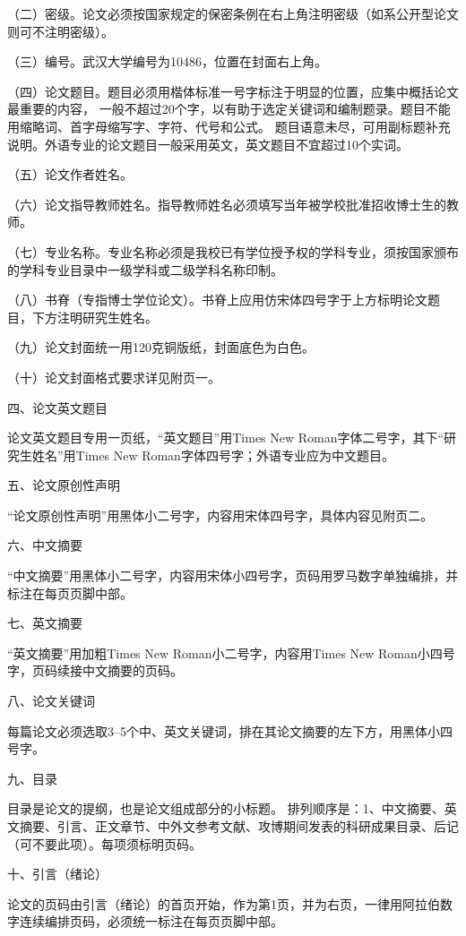 （二）密级。论文必须按国家规定的保密条例在右上角注明密级（如系公开型论文则可不注明密级）。

（三）编号。武汉大学编号为10486，位置在封面右上角。

（四）论文题目。题目必须用楷体标准一号字标注于明显的位置，应集中概括论文最重要的内容，
一般不超过20个字，以有助于选定关键词和编制题录。题目不能用缩略词、首字母缩写字、字符、代号和公式。
题目语意未尽，可用副标题补充说明。外语专业的论文题目一般采用英文，英文题目不宜超过10个实词。

（五）论文作者姓名。

（六）论文指导教师姓名。指导教师姓名必须填写当年被学校批准招收博士生的教师。

（七）专业名称。专业名称必须是我校已有学位授予权的学科专业，须按国家颁布的学科专业目录中一级学科或二级学科名称印制。

（八）书脊（专指博士学位论文）。书脊上应用仿宋体四号字于上方标明论文题目，下方注明研究生姓名。

（九）论文封面统一用120克铜版纸，封面底色为白色。

（十）论文封面格式要求详见附页一。

{\heiti 四、论文英文题目}

论文英文题目专用一页纸，“英文题目”用Times New Roman字体二号字，其下“研究生姓名”用Times New Roman字体四号字；外语专业应为中文题目。

{\heiti 五、论文原创性声明}

“论文原创性声明”用黑体小二号字，内容用宋体四号字，具体内容见附页二。

{\heiti 六、中文摘要}

“中文摘要”用黑体小二号字，内容用宋体小四号字，页码用罗马数字单独编排，并标注在每页页脚中部。

{\heiti 七、英文摘要}

“英文摘要”用加粗Times New Roman小二号字，内容用Times New Roman小四号字，页码续接中文摘要的页码。

{\heiti 八、论文关键词}

每篇论文必须选取3--5个中、英文关键词，排在其论文摘要的左下方，用黑体小四号字。

{\heiti 九、目录}

目录是论文的提纲，也是论文组成部分的小标题。
排列顺序是：1、中文摘要、英文摘要、引言、正文章节、中外文参考文献、攻博期间发表的科研成果目录、后记（可不要此项）。每项须标明页码。

{\heiti 十、引言（绪论）}

论文的页码由引言（绪论）的首页开始，作为第1页，并为右页，一律用阿拉伯数字连续编排页码，必须统一标注在每页页脚中部。

